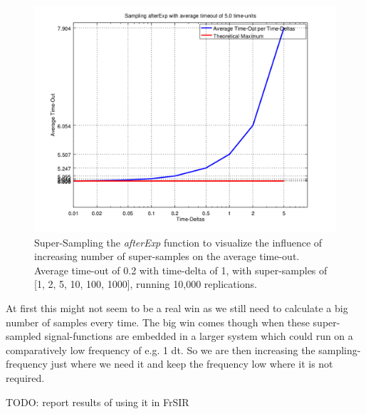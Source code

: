 \begin{figure}
	\centering
	\includegraphics[width=.6\textwidth, angle=0]{./../shared/fig/samplingTest_afterExp_5time.png}
	\caption{Super-Sampling the \textit{afterExp} function to visualize the influence of increasing number of super-samples on the average time-out. Average time-out of 0.2 with time-delta of 1, with super-samples of [1, 2, 5, 10, 100, 1000], running 10,000 replications.}
	\label{fig:sampling_afterExp_ss_02time}
\end{figure}

At first this might not seem to be a real win as we still need to calculate a big number of samples every time. The big win comes though when these super-sampled signal-functions are embedded in a larger system which could run on a comparatively low frequency of e.g. 1 dt. So we are then increasing the sampling-frequency just where we need it and keep the frequency low where it is not required.

TODO: report results of using it in FrSIR